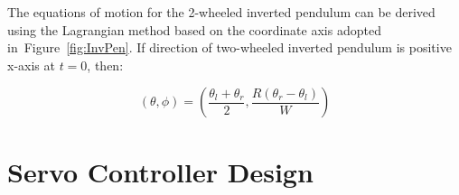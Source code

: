 \documentclass[a4paper,10pt]{article}
\begin{document}
The equations of motion for the 2-wheeled inverted pendulum can be derived using the Lagrangian method based on the coordinate axis adopted in~Figure~\ref{fig:InvPen}. If direction of two-wheeled inverted pendulum is positive x-axis at $t=0$, then:

\begin{equation}
(\theta,\phi) = (\frac{\theta{}_{l}+\theta{}_{r}}{2},\frac{R(\theta{}_{r}-\theta{}_{l})}{W})
\end{equation}

\section{Servo Controller Design}


%
%



%
%
\end{document}
